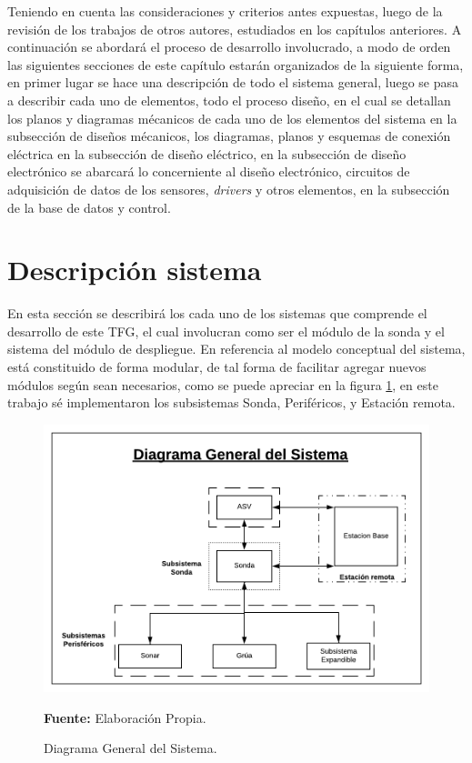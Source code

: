 Teniendo en cuenta las consideraciones y criterios antes expuestas, luego de la revisi\'on de los trabajos de otros autores, estudiados en los cap\'itulos anteriores. A continuaci\'on se abordar\'a el proceso de desarrollo involucrado, a modo de orden las siguientes secciones de este cap\'itulo estar\'an organizados de la siguiente forma, en primer lugar se hace una descripci\'on de todo el sistema general, luego se pasa a describir cada uno de elementos, todo el proceso dise\~no, en el cual se detallan los planos y diagramas m\'ecanicos de cada uno de los elementos del sistema en la subsecci\'on de dise\~nos m\'ecanicos, los diagramas, planos y esquemas de conexi\'on el\'ectrica en la subsecci\'on de dise\~no el\'ectrico, en la subsecci\'on de dise\~no electr\'onico se abarcará lo concerniente al diseño electr\'onico, circuitos de adquisici\'on de datos de los sensores, \textit{drivers} y otros elementos, en la subsecci\'on de la base de datos y control. 

\section{Descripci\'on  sistema }
En esta sección se describirá los cada uno de los sistemas que comprende el desarrollo de este TFG, el cual involucran como ser el m\'odulo de la sonda y el sistema del m\'odulo de despliegue.
En referencia al modelo conceptual del sistema, está constituido de forma modular, de tal forma de facilitar agregar nuevos m\'odulos seg\'un sean necesarios, como se puede apreciar en la figura \ref{fig:DiagramaGeneral}, en este trabajo sé implementaron los subsistemas Sonda, Perif\'ericos, y Estación remota.  

\begin{figure}[H]
    \centering
    \includegraphics[scale=0.4]{Imagenes/cap1/Diagrama.png}
    \caption[Diagrama General del Sistema]{Diagrama General del Sistema. }{\textbf{Fuente:} Elaboración Propia.}
    \label{fig:DiagramaGeneral}
\end{figure}

